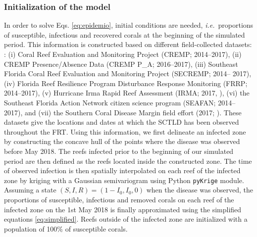 \documentclass[utf8]{frontiersSCNS}
\newcommand{\ie}{{\it i.e.}\ }
\begin{document}
\subsubsection{Initialization of the model}
In order to solve Eqs. \ref{eq:epidemio}, initial conditions are needed, \ie proportions of susceptible, infectious and recovered corals at the beginning of the simulated period. This information is constructed based on different field-collected datasets: : (i) Coral Reef Evaluation and Monitoring Project (CREMP; 2014–2017), (ii) CREMP Presence/Absence Data (CREMP P\_A; 2016–2017), (iii) Southeast Florida Coral Reef Evaluation and Monitoring Project (SECREMP; 2014– 2017), (iv) Florida Reef Resilience Program Disturbance Response Monitoring (FRRP; 2014–2017), (v) Hurricane Irma Rapid Reef Assessment (IRMA; 2017, \cite{viehman2018}), (vi) the Southeast Florida Action Network citizen science program (SEAFAN; 2014–2017), and (vii) the Southern Coral Disease Margin field effort (2017; \cite{neely2018surveying}). These datasets give the locations and dates at which the SCTLD has been observed throughout the FRT. Using this information, we first delineate an infected zone by constructing the concave hull of the points where the disease was observed before May 2018. The reefs infected prior to the beginning of our simulated period are then defined as the reefs located inside the constructed zone. The time of observed infection is then spatially interpolated on each reef of the infected zone by kriging with a Gaussian semivariogram using Python \texttt{pyKrige} module. Assuming a state $(S,I,R)=(1-I_0, I_0, 0)$ when the disease was observed, the proportions of susceptible, infectious and removed corals on each reef of the infected zone on the 1st May 2018 is finally approximated using the simplified equations \ref{eq:simplified}. Reefs outside of the infected zone are initialized with a population of 100\% of susceptible corals.  
\end{document}
